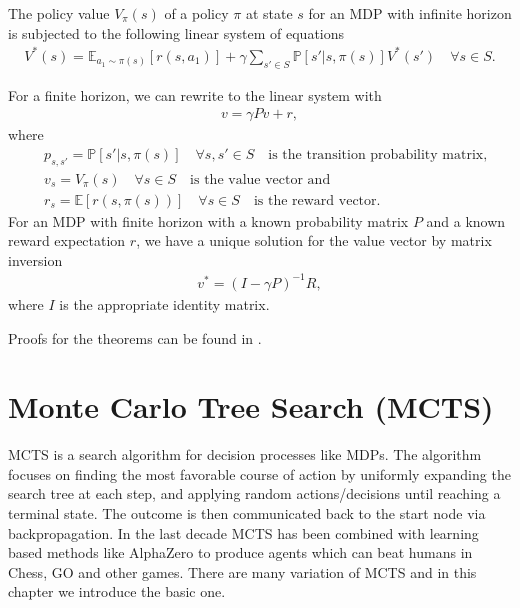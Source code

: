 \begin{theorem}
    The policy value $V_\pi(s)$ of a policy $\pi$ at state $s$ for an MDP
    with infinite horizon is subjected to the following linear system of
    equations
    \begin{align}
        V^{*}(s) = \mathbb{E}_{a_1 \sim \pi(s)}[r(s, a_1)] + \gamma\sum_{s'\in S}
        \mathbb{P}[s'|s, \pi(s)] V^{*}(s') \quad \forall s \in S.
    \end{align}
\end{theorem}
For a finite horizon, we can rewrite to the linear system with
\begin{align}
    v = \gamma P v + r,
\end{align}
where
\begin{align}
    &p_{s, s'} = \mathbb{P}[s'|s, \pi(s)] \quad \forall s,s' \in S \quad
    \text{is the transition probability matrix,}\\
    &v_s = V_\pi(s) \quad \forall s \in S \quad \text{is the value vector and }\\
    &r_s = \mathbb{E}[r(s, \pi(s))] \quad \forall s \in S \quad \text{is the reward
    vector}.
\end{align}
For an MDP with finite horizon with a known probability matrix $P$ and a
known reward expectation $r$, we have a unique solution for the value vector
by matrix inversion
\begin{align}
    v^{*} = (I - \gamma P)^{-1} R,
\end{align}
where $I$ is the appropriate identity matrix.
\newline

Proofs for the theorems can be found in \cite[Chapter~17]{ml_foundations}.
\section{Monte Carlo Tree Search (MCTS)}
MCTS is a search algorithm for decision processes like MDPs. The algorithm
focuses on finding the most favorable course of action by uniformly expanding
the search tree at each step, and applying random actions/decisions until
reaching a terminal state. The outcome is then communicated back to the
start node via backpropagation. In the last decade MCTS has been combined with
learning based methods like AlphaZero \cite{alphazero} to produce agents
which can beat humans in Chess, GO and other games. There are many variation
of MCTS and in this chapter we introduce the basic one.
\newline

